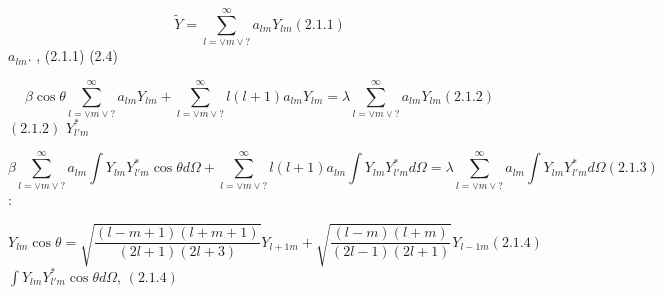 \documentclass[a4paper]{article}
\begin{document}
\begin{equation*}
\widetilde Y=\sum _{l=\vee m\vee ?}^{{\infty}}a_{\mathit{lm}}Y_{\mathit{lm}}(2.1.1)
\end{equation*}
{\CYRN}{\cyra}{\cyrm} {\cyrn}{\cyre}{\cyro}{\cyrb}{\cyrh}{\cyro}{\cyrd}{\cyri}{\cyrm}{\cyro}
{\cyro}{\cyrp}{\cyrr}{\cyre}{\cyrd}{\cyre}{\cyrl}{\cyri}{\cyrt}{\cyrsftsn}
{\cyrk}{\cyro}{\cyrerev}{\cyrf}{\cyrf}{\cyri}{\cyrc}{\cyri}{\cyre}{\cyrn}{\cyrt}{\cyrery}  $a_{\mathit{lm}}$.
{\CYRCH}{\cyrt}{\cyro}{\cyrb}{\cyrery} {\cyrn}{\cyra}{\cyrishrt}{\cyrt}{\cyri} {\cyrerev}{\cyrt}{\cyri}
{\cyrk}{\cyro}{\cyrerev}{\cyrf}{\cyrf}{\cyri}{\cyrc}{\cyri}{\cyre}{\cyrn}{\cyrt}{\cyrery},
{\cyrp}{\cyro}{\cyrd}{\cyrs}{\cyrt}{\cyra}{\cyrv}{\cyri}{\cyrm}
{\cyrr}{\cyra}{\cyrz}{\cyrl}{\cyro}{\cyrzh}{\cyre}{\cyrn}{\cyri}{\cyre} (2.1.1) {\cyrv}
{\cyru}{\cyrr}{\cyra}{\cyrv}{\cyrn}{\cyre}{\cyrn}{\cyri}{\cyre} (2.4)

\begin{equation*}
\beta \cos \theta \sum _{l=\vee m\vee ?}^{{\infty}}a_{\mathit{lm}}Y_{\mathit{lm}}+\sum _{l=\vee m\vee
?}^{{\infty}}l(l+1)a_{\mathit{lm}}Y_{\mathit{lm}}=\lambda \sum _{l=\vee m\vee
?}^{{\infty}}a_{\mathit{lm}}Y_{\mathit{lm}}(2.1.2)
\end{equation*}
{\CYRU}{\cyrm}{\cyrn}{\cyro}{\cyrzh}{\cyri}{\cyrm}  $(2.1.2)$ {\cyrn}{\cyra}  $Y_{l'm}^{\ast }$ {\cyri}
{\cyrp}{\cyrr}{\cyro}{\cyri}{\cyrn}{\cyrt}{\cyre}{\cyrg}{\cyrr}{\cyri}{\cyrr}{\cyru}{\cyre}{\cyrm}

\begin{equation*}
\beta \sum _{l=\vee m\vee ?}^{{\infty}}a_{\mathit{lm}}\int Y_{\mathit{lm}}Y_{l'm}^{\ast }\cos \theta \mathit{d\Omega
}+\sum _{l=\vee m\vee ?}^{{\infty}}l(l+1)a_{\mathit{lm}}\int Y_{\mathit{lm}}Y_{l'm}^{\ast }\mathit{d\Omega }=\lambda
\sum _{l=\vee m\vee ?}^{{\infty}}a_{\mathit{lm}}\int Y_{\mathit{lm}}Y_{l'm}^{\ast }\mathit{d\Omega }(2.1.3)
\end{equation*}
{\CYRV}{\cyro}{\cyrs}{\cyrp}{\cyro}{\cyrl}{\cyrsftsn}{\cyrz}{\cyru}{\cyre}{\cyrm}{\cyrs}{\cyrya}
{\cyri}{\cyrz}{\cyrv}{\cyre}{\cyrs}{\cyrt}{\cyrn}{\cyrery}{\cyrm}
{\cyra}{\cyrl}{\cyrg}{\cyre}{\cyrb}{\cyrr}{\cyra}{\cyri}{\cyrch}{\cyre}{\cyrs}{\cyrk}{\cyri}{\cyrm}
{\cyrs}{\cyrv}{\cyro}{\cyrishrt}{\cyrs}{\cyrt}{\cyrv}{\cyro}{\cyrm}
{\cyrs}{\cyrf}{\cyre}{\cyrr}{\cyri}{\cyrch}{\cyre}{\cyrs}{\cyrk}{\cyri}{\cyrh}
{\cyrf}{\cyru}{\cyrn}{\cyrk}{\cyrc}{\cyri}{\cyrishrt}:

\begin{equation*}
Y_{\mathit{lm}}\cos \theta
=\sqrt{\frac{(l-m+1)(l+m+1)}{\left(2l+1\right)(2l+3)}}Y_{l+1m}+\sqrt{\frac{(l-m)(l+m)}{\left(2l-1\right)(2l+1)}}Y_{l-1m}(2.1.4)
\end{equation*}
{\CYRV}{\cyrery}{\cyrch}{\cyri}{\cyrs}{\cyrl}{\cyri}{\cyrm} {\cyro}{\cyrt}{\cyrd}{\cyre}{\cyrl}{\cyrsftsn}{\cyrn}{\cyro}
{\cyri}{\cyrn}{\cyrt}{\cyre}{\cyrg}{\cyrr}{\cyra}{\cyrl}  $\int Y_{\mathit{lm}}Y_{l'm}^{\ast }\cos \theta
\mathit{d\Omega }$, {\cyrp}{\cyro}{\cyrd}{\cyrs}{\cyrt}{\cyra}{\cyrv}{\cyri}{\cyrv}  $(2.1.4)$ 
\end{document}
